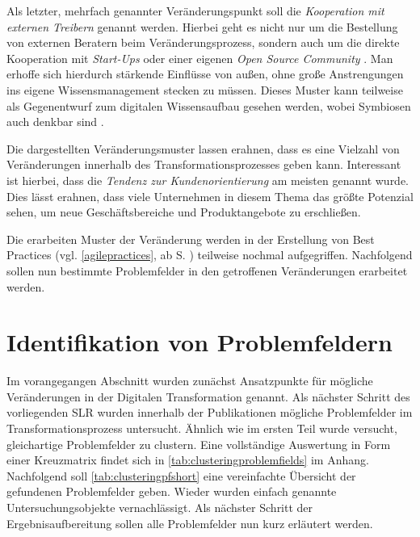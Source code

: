 Als letzter, mehrfach genannter Veränderungspunkt soll die \textit{Kooperation mit externen Treibern} genannt werden. Hierbei geht  es nicht nur um die Bestellung von externen Beratern beim Veränderungsprozess, sondern auch um die direkte Kooperation mit \textit{Start-Ups} oder einer eigenen \textit{Open Source Community} \cite[S. 139]{urbach_digitalization_2018}. Man erhoffe sich hierdurch stärkende Einflüsse von außen, ohne große Anstrengungen ins eigene Wissensmanagement stecken zu müssen. Dieses Muster kann teilweise als Gegenentwurf zum digitalen Wissensaufbau gesehen werden, wobei Symbiosen auch denkbar sind \cite[S. 154]{urbach_digitalization_2018}.

Die dargestellten Veränderungsmuster lassen erahnen, dass es eine Vielzahl von Veränderungen innerhalb des Transformationsprozesses geben kann. Interessant ist hierbei, dass die \textit{Tendenz zur Kundenorientierung} am meisten genannt wurde. Dies lässt erahnen, dass viele Unternehmen in diesem Thema das größte Potenzial sehen, um neue Geschäftsbereiche und Produktangebote zu erschließen.

Die erarbeiten Muster der Veränderung werden in der Erstellung von Best Practices (vgl. \ref{agilepractices}, ab S. \pageref{agilepractices}) teilweise nochmal aufgegriffen. Nachfolgend sollen nun bestimmte Problemfelder in den getroffenen  Veränderungen erarbeitet werden.

\section{Identifikation von Problemfeldern}
\label{problemfields:fields}

Im vorangegangen Abschnitt wurden zunächst Ansatzpunkte für mögliche Veränderungen in der Digitalen Transformation genannt. Als nächster Schritt des vorliegenden SLR wurden innerhalb der Publikationen mögliche Problemfelder im Transformationsprozess untersucht. Ähnlich wie im ersten Teil wurde versucht, gleichartige Problemfelder zu clustern. Eine vollständige Auswertung in Form einer Kreuzmatrix findet sich in \ref{tab:clusteringproblemfields} im Anhang. Nachfolgend soll \ref{tab:clusteringpfshort} eine vereinfachte Übersicht der gefundenen  Problemfelder geben. Wieder wurden einfach genannte Untersuchungsobjekte vernachlässigt. Als nächster Schritt  der Ergebnisaufbereitung sollen alle Problemfelder nun kurz erläutert werden.

